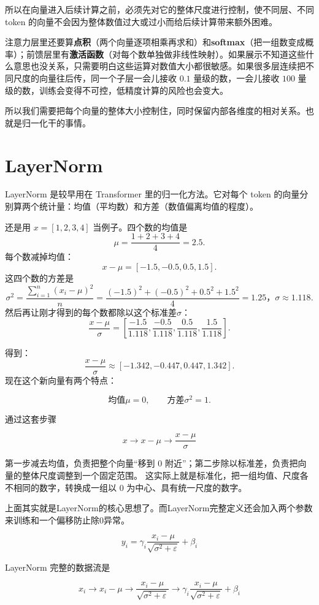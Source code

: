 \documentclass[UTF8,11pt,a4paper]{ctexart}
\begin{document}
所以在向量进入后续计算之前，必须先对它的整体尺度进行控制，使不同层、不同 token 的向量不会因为整体数值过大或过小而给后续计算带来额外困难。

注意力层里还要算\textbf{点积}（两个向量逐项相乘再求和）和\textbf{softmax}（把一组数变成概率）；前馈层里有\textbf{激活函数}（对每个数单独做非线性映射）。如果展示不知道这些什么意思也没关系，只需要明白这些运算对数值大小都很敏感。如果很多层连续把不同尺度的向量往后传，同一个子层一会儿接收 $0.1$ 量级的数，一会儿接收 $100$ 量级的数，训练会变得不可控，低精度计算的风险也会变大。

所以我们需要把每个向量的整体大小控制住，同时保留内部各维度的相对关系。也就是归一化干的事情。

\section{LayerNorm}

LayerNorm 是较早用在 Transformer 里的归一化方法。它对每个 token 的向量分别算两个统计量：均值（平均数）和方差（数值偏离均值的程度）。

还是用 $x=[1,2,3,4]$ 当例子。四个数的均值是
\[
\mu=\frac{1+2+3+4}{4}=2.5.
\]
每个数减掉均值：
\[
x-\mu=[-1.5,-0.5,0.5,1.5].
\]
这四个数的方差是
\[
\sigma^2=\frac{\sum_{i=1}^{n}{(x_i-\mu)^2}}{n}=\frac{(-1.5)^2+(-0.5)^2+0.5^2+1.5^2}{4}=1.25，
\sigma\approx1.118.
\]
然后再让刚才得到的每个数都除以这个标准差$\sigma$：
\[
\frac{x-\mu}{\sigma}
=
\left[
\frac{-1.5}{1.118},
\frac{-0.5}{1.118},
\frac{0.5}{1.118},
\frac{1.5}{1.118}
\right].
\]

得到：
\[
\frac{x-\mu}{\sigma}
\approx
[-1.342,-0.447,0.447,1.342].
\]
现在这个新向量有两个特点：

\[
\text{均值$\mu$}=0,
\qquad
\text{方差$\sigma^2$}=1.
\]

通过这套步骤

\[
\boxed{
x
\longrightarrow
x-\mu
\longrightarrow
\frac{x-\mu}{\sigma}
}
\]

第一步减去均值，负责把整个向量“移到 0 附近”；第二步除以标准差，负责把向量的整体尺度调整到一个固定范围。
这实际上就是标准化，把一组均值、尺度各不相同的数字，转换成一组以 0 为中心、具有统一尺度的数字。

上面其实就是LayerNorm的核心思想了。而LayerNorm完整定义还会加入两个参数来训练和一个偏移防止除0异常。

\[
\boxed{
y_i
=
\gamma_i
\frac{x_i-\mu}
{\sqrt{\sigma^2+\varepsilon}}
+
\beta_i
}
\]

LayerNorm 完整的数据流是

\[
\boxed{
x_i
\longrightarrow
x_i-\mu
\longrightarrow
\frac{x_i-\mu}{\sqrt{\sigma^2+\varepsilon}}
\longrightarrow
\gamma_i
\frac{x_i-\mu}{\sqrt{\sigma^2+\varepsilon}}
+\beta_i
}
\]
\end{document}
